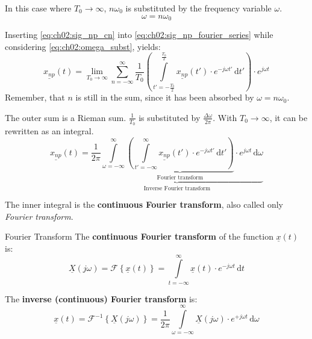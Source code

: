 \begin{refsection}
In this case where $T_0 \rightarrow \infty$, $n \omega_0$ is substituted by the frequency variable $\omega$.
\begin{equation}
	\omega = n \omega_0
	\label{eq:ch02:omega_subst}
\end{equation}

Inserting \eqref{eq:ch02:sig_np_cn} into \eqref{eq:ch02:sig_np_fourier_series} while considering \eqref{eq:ch02:omega_subst}, yields:
\begin{equation}
	\underline{x_{np}}(t) = \lim\limits_{T_0 \rightarrow \infty} \sum\limits_{n = -\infty}^{\infty} \frac{1}{T_0} \left( \int\limits_{t' = -\frac{T_0}{2}}^{\frac{T_0}{2}} \underline{x_{np}}(t') \cdot e^{-j \omega t'} \, \mathrm{d} t' \right) \cdot e^{j \omega t}
\end{equation}
Remember, that $n$ is still in the sum, since it has been absorbed by $\omega = n \omega_0$.

The outer sum is a Rieman sum. $\frac{1}{T_0}$ is substituted by $\frac{\Delta \omega}{2 \pi}$. With $T_0 \rightarrow \infty$, it can be rewritten as an integral.
\begin{equation}
	\underline{x_{np}}(t) = \underbrace{\frac{1}{2 \pi} \int\limits_{\omega = -\infty}^{\infty} \underbrace{\left( \int\limits_{t' = -\infty}^{\infty} \underline{x_{np}}(t') \cdot e^{-j \omega t'} \, \mathrm{d} t' \right)}_{\text{Fourier transform}} \cdot e^{j \omega t} \, \mathrm{d} \omega}_{\text{Inverse Fourier transform}}
\end{equation}

The inner integral is the \textbf{continuous Fourier transform}, also called only  \emph{Fourier transform}. 

\begin{definition}{Fourier Transform}
	The  \textbf{continuous Fourier transform} of the function $\underline{x}(t)$ is:
	\begin{equation}
		\underline{X}(j \omega) = \mathcal{F} \left\{\underline{x}(t)\right\} = \int\limits_{t = -\infty}^{\infty} \underline{x}(t) \cdot e^{-j \omega t} \, \mathrm{d} t
		\label{eq:ch02:def_fourier_transform}
	\end{equation}
	
	The   \textbf{inverse (continuous) Fourier transform} is:
	\begin{equation}
		\underline{x}(t) = \mathcal{F}^{-1} \left\{\underline{X}(j \omega)\right\} = \frac{1}{2 \pi} \int\limits_{\omega = -\infty}^{\infty} \underline{X}(j \omega) \cdot e^{+j \omega t} \, \mathrm{d} \omega
		\label{eq:ch02:def_inv_fourier_transform}
	\end{equation}
\end{definition}


\end{refsection}
